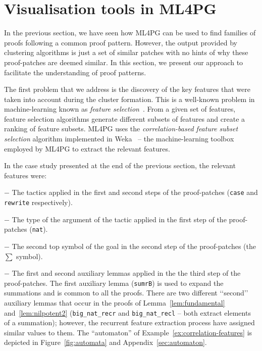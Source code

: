 \section{Visualisation tools in ML4PG}\label{sec:visualisation}


In the previous section, we have seen how ML4PG can be used to find families of proofs following
a common proof pattern. However, the output provided by clustering algorithms is just a set
of similar patches with no hints of why these proof-patches are deemed similar.
In this section, we present our approach to facilitate the understanding of proof patterns.


The first problem that we address is the discovery of the key features that were taken
into account during the cluster formation. This is a well-known problem in machine-learning
known as \emph{feature selection}~\cite{Weka}. From a given set of features, feature selection algorithms
generate different subsets of features and create a ranking of feature subsets.
ML4PG uses the \emph{correlation-based feature subset selection} algorithm implemented in Weka~\cite{Weka}
-- the machine-learning toolbox employed by ML4PG to extract the relevant features.

\begin{example}\label{ex:correlation-features}
In the case study presented at the end of the previous section, the relevant features were:

$-$ The tactics applied in the first and second steps of the proof-patches (\lstinline?case? and \lstinline?rewrite? respectively).

$-$ The type of the argument of the tactic applied in the first step of the proof-patches (\lstinline?nat?).

$-$ The second top symbol of the goal in the second step of the proof-patches (the $\sum$ symbol).

$-$ The first and second auxiliary lemmas applied in the the third step of the proof-patches. The first auxiliary lemma (\lstinline?sumrB?) is used to expand the summations and is
common to all the proofs. There are two different \lq\lq{}second\rq\rq{} auxiliary lemmas that occur in the proofs of Lemma~\ref{lem:fundamental} and~\ref{lem:nilpotent2} (\lstinline?big_nat_recr? and
\lstinline?big_nat_recl? -- both extract elements of a summation); however, the recurrent feature extraction process have assigned similar values to them.
The ``automaton'' of Example~\ref{ex:correlation-features} is depicted in Figure~\ref{fig:automata} and Appendix~\ref{sec:automaton}.
\end{example}

